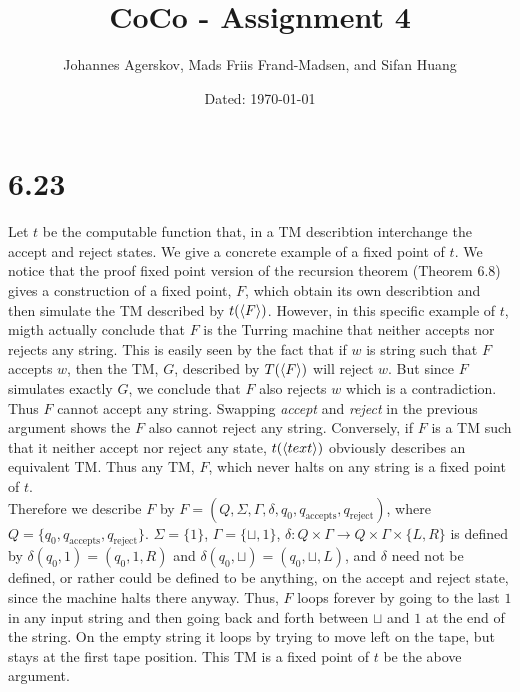 \documentclass[a4paper,11pt]{article}
\author{Johannes Agerskov, Mads Friis Frand-Madsen, and Sifan Huang}
\date{Dated: \today}
\title{CoCo - Assignment 4}
\numberwithin{equation}{section}
\begin{document}
\maketitle
\section*{6.23}
Let $ t $ be the computable function that, in a TM describtion interchange the accept and reject states. We give a concrete example of a fixed point of $ t $. We notice that the proof fixed point version of the recursion theorem (Theorem 6.8) gives a construction of a fixed point, $ F $, which obtain its own describtion and then simulate the TM described by $ t(\braket{F}) $. However, in this specific example of $ t $, migth actually conclude that $ F $ is the Turring machine that neither accepts nor rejects any string. This is easily seen by the fact that if $ w $ is string such that $ F $ accepts $ w $, then the TM, $ G $, described by $ T(\braket{F}) $ will reject $ w $. But since $ F $ simulates exactly $ G $, we conclude that $ F $ also rejects $ w $ which is a contradiction. Thus $ F $ cannot accept any string. Swapping \emph{accept} and \emph{reject} in the previous argument shows the $ F $ also cannot reject any string. Conversely, if $ F $ is a TM such that it neither accept nor reject any state, $ t(\braket{text}) $ obviously describes an equivalent TM. Thus any TM, $ F $, which never halts on any string is a fixed point of $ t $.\\ 
Therefore we describe $ F $ by $ F=(Q,\Sigma,\Gamma,\delta,q_0,q_{\text{accepts}},q_{\text{reject}}) $, where $ Q=\{q_0,q_{\text{accepts}},q_{\text{reject}}\} $. $ \Sigma=\{1\} $, $ \Gamma=\{\sqcup,1\} $, $ \delta: Q\times \Gamma\to Q\times\Gamma\times\{L,R\} $ is defined by $ \delta(q_0,1)=(q_0,1,R) $ and $ \delta(q_0,\sqcup)=(q_0,\sqcup,L) $, and $ \delta $ need not be defined, or rather could be defined to be anything, on the accept and reject state, since the machine halts there anyway. Thus, $ F $ loops forever by going to the last $ 1 $ in any input string and then going back and forth between $ \sqcup $ and $ 1 $ at the end of the string. On the empty string it loops by trying to move left on the tape, but stays at the first tape position. This TM is a fixed point of $ t $ be the above argument.
\end{document}
